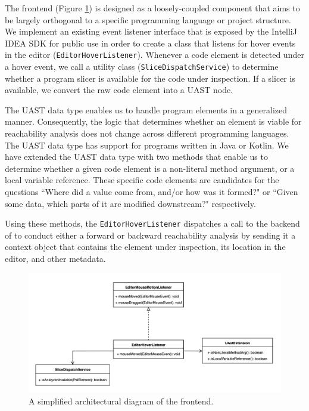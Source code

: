 The \toolname{} frontend (Figure \ref{fig:ReachHoverFrontend}) is designed as 
a loosely-coupled component that aims to be largely orthogonal to a specific 
programming language or project structure.
We implement an existing event listener interface that is exposed by the
IntelliJ IDEA \ac{SDK} for public use in order to create a class that listens
for hover events in the editor (\texttt{EditorHoverListener}).
Whenever a code element is detected under a hover event, we call a utility 
class (\texttt{SliceDispatchService}) to determine whether a program slicer
is available for the code under inspection.
If a slicer is available, we convert the raw code element into a \ac{UAST} node.

\par The \ac{UAST} data type enables us to handle program elements in a
generalized manner. 
Consequently, the logic that determines whether an element is viable for
reachability analysis does not change across different programming languages.
The \ac{UAST} data type has support for programs written in Java or Kotlin.
We have extended the \ac{UAST} data type with two methods that enable us to
determine whether a given code element is a non-literal method argument, or
a local variable reference.
These specific code elements are candidates for the questions 
``Where did a value come from, and/or how was it formed?" or 
``Given some data, which parts of it are modified downstream?" respectively.

\par Using these methods, the \texttt{EditorHoverListener} dispatches a call to
the backend of \toolname{} to conduct either a forward or backward reachability
analysis by sending it a context object that contains the element under 
inspection, its location in the editor, and other metadata.

\begin{figure}[ht]
\centering
\includegraphics[width=\textwidth]{./figs/reach-hover-frontend.png}
\caption{
  A simplified architectural diagram of the \toolname{} frontend.
}
\label{fig:ReachHoverFrontend}
\end{figure}

